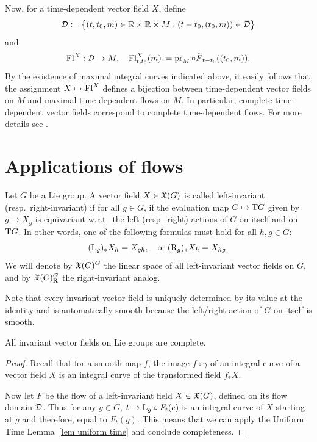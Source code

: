 \begin{rem}
    Now, for a time-dependent vector field $X$, define 
    \[\calD\coloneqq \left\{(t,t_0,m)\in\bbR\times\bbR\times M:(t-t_0,(t_0,m))\in\wt\calD\right\}\]
    and 
    \[\Fl^X:\calD\to M,\quad \Fl^X_{t,t_0}(m)\coloneqq \pr_M\circ \wt{F}_{t-t_0}((t_0,m)).\]
    By the existence of maximal integral curves indicated above, it easily follows that the assignment $X\mapsto \mathrm{Fl}^X$ defines a bijection between time-dependent vector fields on $M$ and maximal time-dependent flows on $M$. In particular, complete time-dependent vector fields correspond to complete time-dependent flows. For more details see \cite[Sec.~3.4]{RS1}.
\end{rem}













\section{Applications of flows}\label{sec: applications of flows}



\begin{defn}
    Let $G$ be a Lie group. A vector field $X\in\mathfrak{X}(G)$ is called left-invariant (resp.~right-invariant) if for all $g\in G$, if the evaluation map $G\mapsto \mathrm{T} G$ given by $g\mapsto X_g$ is equivariant w.r.t.\ the left (resp.~right) actions of $G$ on itself and on $\mathrm{T} G$. In other words, one of the following formulas must hold for all $h,g\in G$:
    \[(\mathrm{L}_g)_{\ast}X_h=X_{gh},\quad \text{or}\; (\mathrm{R}_g)_{\ast}X_h=X_{hg}.\]
    We will denote by $\mathfrak{X}(G)^G$ the linear space of all left-invariant vector fields on $G$, and by $\mathfrak{X}(G)^G_{\mathrm{R}}$ the right-invariant analog.
\end{defn}

Note that every invariant vector field is uniquely determined by its value at the identity and is automatically smooth because the left/right action of $G$ on itself is smooth.

\begin{thm}\label{thm invariant fields are complete}
    All invariant vector fields on Lie groups are complete.
\end{thm}
\begin{proof}
    Recall that for a smooth map $f$, the image $f\circ\gamma$ of an integral curve of a vector field $X$ is an integral curve of the transformed field $f_\ast X$. 
    
    Now let $F$ be the flow of a left-invariant field $X\in \mathfrak{X}(G)$, defined on its flow domain $\mathcal{D}$. Thus for any $g\in G$, $t\mapsto \mathrm{L}_g\circ F_t(e)$ is an integral curve of $X$ starting at $g$ and therefore, equal to $F_t(g)$. This means that we can apply the Uniform Time Lemma~\ref{lem uniform time} and conclude completeness.
\end{proof}

